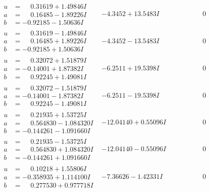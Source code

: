 \documentclass[1p]{elsarticle_modified}
\theoremstyle{definition}
\begin{document}
$$\begin{array}{c|c|c}
\begin{aligned}
u &= \phantom{-}0.31619 + 1.49846 I \\
a &= \phantom{-}0.16485 - 1.89226 I \\
b &= -0.92185 - 1.50636 I\end{aligned}
 & -4.3452 + 13.5483 I & \phantom{-0.000000 } 0 \\ \hline\begin{aligned}
u &= \phantom{-}0.31619 - 1.49846 I \\
a &= \phantom{-}0.16485 + 1.89226 I \\
b &= -0.92185 + 1.50636 I\end{aligned}
 & -4.3452 - 13.5483 I & \phantom{-0.000000 } 0 \\ \hline\begin{aligned}
u &= \phantom{-}0.32072 + 1.51879 I \\
a &= -0.14001 + 1.87382 I \\
b &= \phantom{-}0.92245 + 1.49081 I\end{aligned}
 & -6.2511 + 19.5398 I & \phantom{-0.000000 } 0 \\ \hline\begin{aligned}
u &= \phantom{-}0.32072 - 1.51879 I \\
a &= -0.14001 - 1.87382 I \\
b &= \phantom{-}0.92245 - 1.49081 I\end{aligned}
 & -6.2511 - 19.5398 I & \phantom{-0.000000 } 0 \\ \hline\begin{aligned}
u &= \phantom{-}0.21935 + 1.53725 I \\
a &= \phantom{-}0.564830 - 1.084320 I \\
b &= -0.144261 - 1.091660 I\end{aligned}
 & -12.04140 + 0.55096 I & \phantom{-0.000000 } 0 \\ \hline\begin{aligned}
u &= \phantom{-}0.21935 - 1.53725 I \\
a &= \phantom{-}0.564830 + 1.084320 I \\
b &= -0.144261 + 1.091660 I\end{aligned}
 & -12.04140 - 0.55096 I & \phantom{-0.000000 } 0 \\ \hline\begin{aligned}
u &= \phantom{-}0.10218 + 1.55806 I \\
a &= -0.358935 + 1.114100 I \\
b &= \phantom{-}0.277530 + 0.977718 I\end{aligned}
 & -7.36626 - 1.42331 I & \phantom{-0.000000 } 0 \\ \hline\begin{aligned}

\end{aligned}
\end{array}$$
\end{document}
